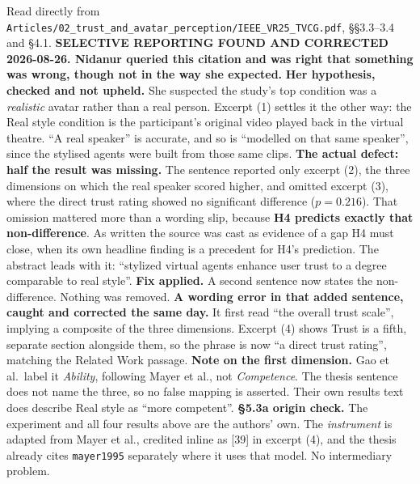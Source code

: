 \documentclass[11pt, a4paper]{article}
\begin{document}
\begin{Form}
  {Read directly from \texttt{\footnotesize Articles/02\_trust\_and\_avatar\_perception/IEEE\_VR25\_TVCG.pdf}, \S\S3.3--3.4 and \S4.1. \textbf{SELECTIVE REPORTING FOUND AND CORRECTED 2026-08-26. Nidanur queried this citation and was right that something was wrong, though not in the way she expected.} \textbf{Her hypothesis, checked and not upheld.} She suspected the study's top condition was a \emph{realistic} avatar rather than a real person. Excerpt (1) settles it the other way: the Real style condition is the participant's original video played back in the virtual theatre. ``A real speaker'' is accurate, and so is ``modelled on that same speaker'', since the stylised agents were built from those same clips. \textbf{The actual defect: half the result was missing.} The sentence reported only excerpt (2), the three dimensions on which the real speaker scored higher, and omitted excerpt (3), where the direct trust rating showed no significant difference ($p = 0.216$). That omission mattered more than a wording slip, because \textbf{H4 predicts exactly that non-difference}. As written the source was cast as evidence of a gap H4 must close, when its own headline finding is a precedent for H4's prediction. The abstract leads with it: ``stylized virtual agents enhance user trust to a degree comparable to real style''. \textbf{Fix applied.} A second sentence now states the non-difference. Nothing was removed. \textbf{A wording error in that added sentence, caught and corrected the same day.} It first read ``the overall trust scale'', implying a composite of the three dimensions. Excerpt (4) shows Trust is a fifth, separate section alongside them, so the phrase is now ``a direct trust rating'', matching the Related Work passage. \textbf{Note on the first dimension.} Gao et al.\ label it \emph{Ability}, following Mayer et al., not \emph{Competence}. The thesis sentence does not name the three, so no false mapping is asserted. Their own results text does describe Real style as ``more competent''. \textbf{\S5.3a origin check.} The experiment and all four results above are the authors' own. The \emph{instrument} is adapted from Mayer et al., credited inline as [39] in excerpt (4), and the thesis already cites \texttt{mayer1995} separately where it uses that model. No intermediary problem.}


\end{Form}
\end{document}
